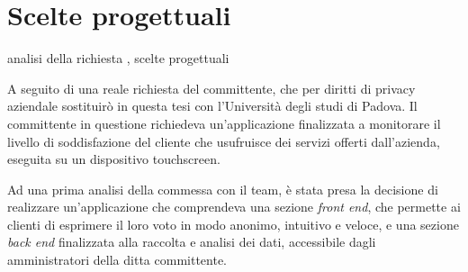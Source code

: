 \section{Scelte progettuali}
analisi della richiesta , scelte progettuali

A seguito di una reale richiesta del committente, che per diritti di privacy
aziendale sostituirò in questa tesi con l'Università degli studi di Padova. Il
committente in questione richiedeva un'applicazione finalizzata a monitorare il
livello di soddisfazione del cliente che usufruisce dei servizi offerti
dall'azienda, eseguita su un dispositivo touchscreen.

Ad una prima analisi della commessa con il team, è stata presa la decisione di
realizzare un'applicazione che comprendeva una sezione \textit{front end}, che
permette ai clienti di esprimere il loro voto in modo anonimo,  intuitivo e
veloce, e una sezione \textit{back end} finalizzata alla raccolta e analisi dei
dati, accessibile dagli amministratori della ditta committente.

